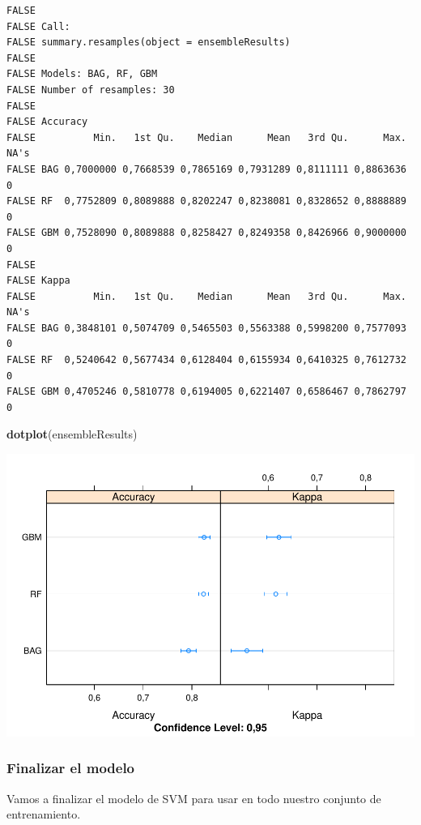 \documentclass[]{article}
\newenvironment{Shaded}{\begin{snugshade}}{\end{snugshade}}
\newcommand{\KeywordTok}[1]{\textcolor[rgb]{0.13,0.29,0.53}{\textbf{#1}}}
\newcommand{\NormalTok}[1]{#1}
\begin{document}
\begin{verbatim}
FALSE 
FALSE Call:
FALSE summary.resamples(object = ensembleResults)
FALSE 
FALSE Models: BAG, RF, GBM 
FALSE Number of resamples: 30 
FALSE 
FALSE Accuracy 
FALSE          Min.   1st Qu.    Median      Mean   3rd Qu.      Max. NA's
FALSE BAG 0,7000000 0,7668539 0,7865169 0,7931289 0,8111111 0,8863636    0
FALSE RF  0,7752809 0,8089888 0,8202247 0,8238081 0,8328652 0,8888889    0
FALSE GBM 0,7528090 0,8089888 0,8258427 0,8249358 0,8426966 0,9000000    0
FALSE 
FALSE Kappa 
FALSE          Min.   1st Qu.    Median      Mean   3rd Qu.      Max. NA's
FALSE BAG 0,3848101 0,5074709 0,5465503 0,5563388 0,5998200 0,7577093    0
FALSE RF  0,5240642 0,5677434 0,6128404 0,6155934 0,6410325 0,7612732    0
FALSE GBM 0,4705246 0,5810778 0,6194005 0,6221407 0,6586467 0,7862797    0
\end{verbatim}

\begin{Shaded}
\begin{Highlighting}[]
\KeywordTok{dotplot}\NormalTok{(ensembleResults)}
\end{Highlighting}
\end{Shaded}

\includegraphics{titanicDataClean_files/figure-latex/datasetTrain_ensembles_plot-1.pdf}

\subsubsection{Finalizar el modelo}\label{finalizar-el-modelo}

Vamos a finalizar el modelo de SVM para usar en todo nuestro conjunto de
entrenamiento.
\end{document}
